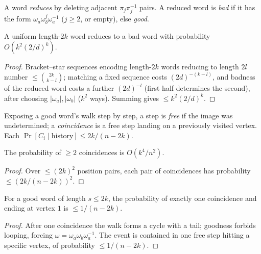 \begin{definition}
  \label{def:words}
  A word \emph{reduces} by deleting adjacent $\pi_j\pi_j^{-1}$ pairs. A reduced
  word is \emph{bad} if it has the form $\omega_a\omega_b^j\omega_a^{-1}$
  ($j\ge2$, or empty), else \emph{good}.
\end{definition}

\begin{lemma}
  \label{lem:bad-word}
  A uniform length-$2k$ word reduces to a bad word with probability
  $O(k^2(2/d)^k)$.
\end{lemma}
\begin{proof}
  Bracket--star sequences encoding length-$2k$ words reducing to length $2l$
  number $\le\binom{2k}{k-l}$; matching a fixed sequence costs $(2d)^{-(k-l)}$,
  and badness of the reduced word costs a further $(2d)^{-l}$ (first half
  determines the second), after choosing $|\omega_a|,|\omega_b|$ ($k^2$ ways).
  Summing gives $\le k^2(2/d)^k$.
\end{proof}

\begin{definition}
  \label{def:coincidence}
  Exposing a good word's walk step by step, a step is \emph{free} if the image
  was undetermined; a \emph{coincidence} is a free step landing on a previously
  visited vertex. Each $\Pr[C_i\mid\text{history}]\le2k/(n-2k)$.
\end{definition}

\begin{claim}
  \label{claim:two-coincidence}
  The probability of $\ge2$ coincidences is $O(k^4/n^2)$.
\end{claim}
\begin{proof}
  Over $\le(2k)^2$ position pairs, each pair of coincidences has probability
  $\le(2k/(n-2k))^2$.
\end{proof}

\begin{lemma}
  \label{lem:one-coincidence}
  For a good word of length $s\le2k$, the probability of exactly one coincidence
  and ending at vertex $1$ is $\le1/(n-2k)$.
\end{lemma}
\begin{proof}
  After one coincidence the walk forms a cycle with a tail; goodness forbids
  looping, forcing $\omega=\omega_a\omega_b\omega_a^{-1}$. The event is contained
  in one free step hitting a specific vertex, of probability $\le1/(n-2k)$.
\end{proof}

